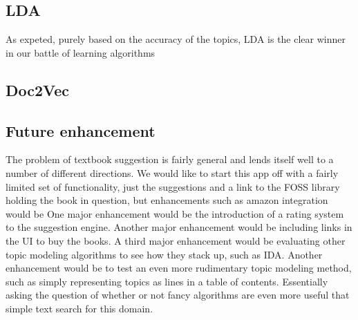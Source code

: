 \subsection{LDA}
\label{sec:conc:lda}
As expeted, purely based on the accuracy of the topics, LDA is the
clear winner in our battle of learning algorithms



\subsection{Doc2Vec}
\label{sec:conc:doc2vec}



\subsection{Future enhancement}
The problem of textbook suggestion is fairly general and lends itself well to a number of different directions.
We would like to start this app off with a fairly limited set of functionality, just the suggestions and a link to the FOSS library holding the book in question, but enhancements such as amazon integration would be 
One major enhancement would be the introduction of a rating system to the suggestion engine.  
Another major enhancement would be including links in the UI to buy the books.
A third major enhancement would be evaluating other topic modeling algorithms to see how they stack up, such as IDA.
Another enhancement would be to test an even more rudimentary topic modeling method, such as simply representing topics as lines in a table of contents.  
Essentially asking the question of whether or not fancy algorithms are
even more useful that simple text search for this domain.


 